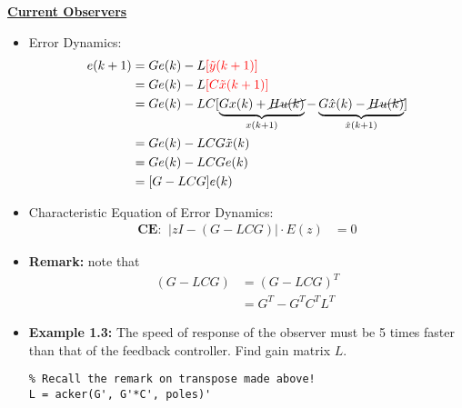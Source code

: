 \textbf{\large \underline{Current Observers}}
\begin{itemize}
    \item Error Dynamics:
    \begin{align*}
        e(k+1) &= G e(k) - L\color{red} [\Tilde{y}(k+1)] \\
        &= Ge(k)-L\color{red}[C\Tilde{x}(k+1)] \\
        &= Ge(k)-LC[ \underbrace{Gx(k)+\cancel{Hu(k)}}_{x(k+1)}-\underbrace{G\hat{x}(k)-\cancel{Hu(k)}}_{\hat{x}(k+1)}]\\
        &= Ge(k)-LCG\Tilde{x}(k) \\
        &= Ge(k)-LCGe(k) \\
        &= [G-LCG]e(k)
    \end{align*}
    \item Characteristic Equation of Error Dynamics:
    \begin{align*}
        \textbf{CE:}\;\; \left|zI-(G-LCG)\right|\cdot E(z)&=0
    \end{align*}
    \item \textbf{Remark:} note that
    \begin{align*}
        (G-LCG) &= (G-LCG)^T \\
        &= G^T - G^T C^T L^T
    \end{align*}
    \item \textbf{Example 1.3:} The speed of response of the observer must be 5 times faster than that of the feedback controller. Find gain matrix $L$.
\begin{lstlisting}
% Recall the remark on transpose made above!
L = acker(G', G'*C', poles)'
\end{lstlisting}
\end{itemize}